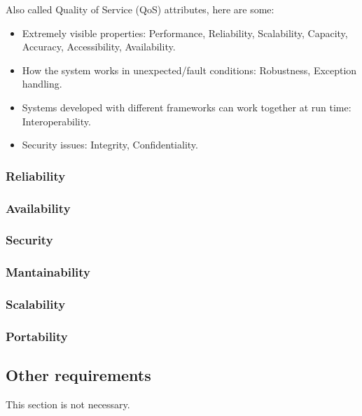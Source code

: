 Also called Quality of Service (QoS) attributes, here are some:
\begin{itemize}
    \item Extremely visible properties: Performance, Reliability, Scalability, Capacity, Accuracy, Accessibility, Availability.
    \item How the system works in unexpected/fault conditions: Robustness, Exception handling.
    \item Systems developed with different frameworks can work together at run time: Interoperability.
    \item Security issues: Integrity, Confidentiality.
\end{itemize}

\subsubsection{Reliability}
\label{subsubsect:reliability}

\subsubsection{Availability}
\label{subsubsect:availability}

\subsubsection{Security}
\label{subsubsect:security}

\subsubsection{Mantainability}
\label{subsubsect:mantainability}

\subsubsection{Scalability}
\label{subsubsect:scalability}

\subsubsection{Portability}
\label{subsubsect:portability}

\subsection{Other requirements}
\label{subsect:otherrequirements}

This section is not necessary.
